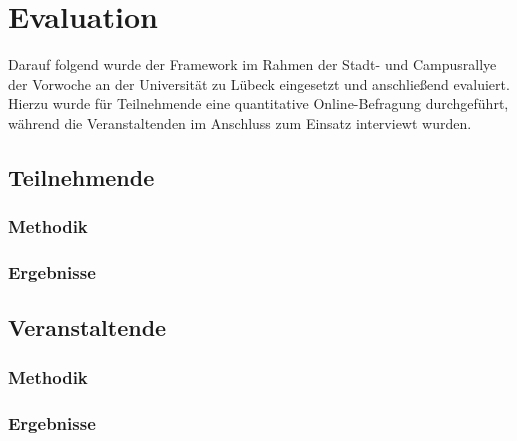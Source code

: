 \chapter{Evaluation}

Darauf folgend wurde der Framework im Rahmen der Stadt- und Campusrallye der
Vorwoche an der Universität zu Lübeck eingesetzt und anschließend evaluiert.
Hierzu wurde für Teilnehmende eine quantitative Online-Befragung durchgeführt,
während die Veranstaltenden im Anschluss zum Einsatz interviewt wurden.

\section{Teilnehmende}

\subsection{Methodik}


%

\subsection{Ergebnisse}

\section{Veranstaltende}

\subsection{Methodik}

\subsection{Ergebnisse}